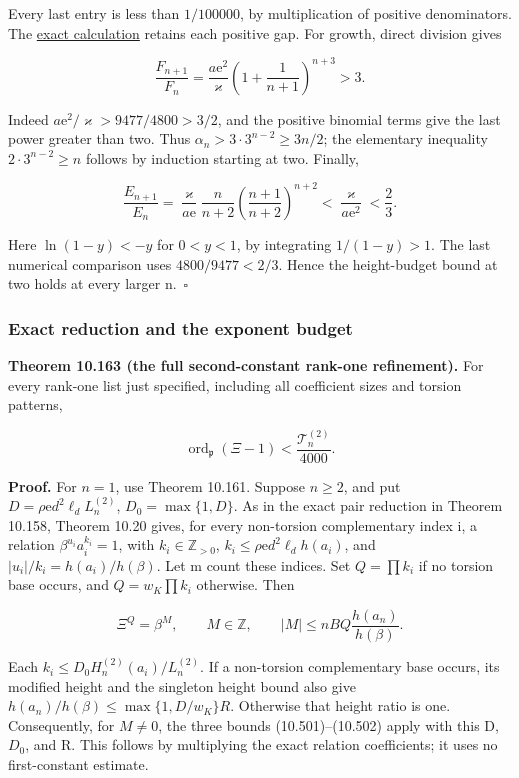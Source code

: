 \documentclass[
  11pt,
  a4paper,
]{article}
\begin{document}
Every last entry is less than \(1/100000\), by multiplication of
positive denominators. The
\href{../figure_sources/yu_second_rank_one_budget.py}{exact calculation}
retains each positive gap. For growth, direct division gives

\[
\frac{F_{n+1}}{F_n}
=\frac{a\mathrm e^2}{\varkappa}
\left(1+\frac1{n+1}\right)^{n+3}>3.
\tag{10.532}
\]

Indeed \(a\mathrm e^2/\varkappa>9477/4800>3/2\), and the positive
binomial terms give the last power greater than two. Thus
\(\alpha_n>3\cdot3^{n-2}\ge3n/2\); the elementary inequality
\(2\cdot3^{n-2}\ge n\) follows by induction starting at two. Finally,

\[
\frac{E_{n+1}}{E_n}
=\frac{\varkappa}{a\mathrm e}\frac n{n+2}
\left(\frac{n+1}{n+2}\right)^{n+2}
<\frac{\varkappa}{a\mathrm e^2}<\frac23.
\tag{10.533}
\]

Here \(\ln(1-y)<-y\) for \(0<y<1\), by integrating \(1/(1-y)>1\). The
last numerical comparison uses \(4800/9477<2/3\). Hence the
height-budget bound at two holds at every larger n.~\(\square\)

\subsubsection{Exact reduction and the exponent
budget}\label{exact-reduction-and-the-exponent-budget}

\textbf{Theorem 10.163 (the full second-constant rank-one refinement).}
For every rank-one list just specified, including all coefficient sizes
and torsion patterns,

\[
\operatorname{ord}_{\mathfrak p}(\Xi-1)
<\frac{\mathcal T_n^{(2)}}{4000}.
\tag{10.534}
\]

\textbf{Proof.} For \(n=1\), use Theorem 10.161. Suppose \(n\ge2\), and
put \(D=\rho\mathrm e d^2\ell_dL_n^{(2)}\), \(D_0=\max\{1,D\}\). As in
the exact pair reduction in Theorem 10.158, Theorem 10.20 gives, for
every non-torsion complementary index i, a relation
\(\beta^{u_i}a_i^{k_i}=1\), with \(k_i\in\mathbb Z_{>0}\),
\(k_i\le\rho\mathrm e d^2\ell_dh(a_i)\), and
\(|u_i|/k_i=h(a_i)/h(\beta)\). Let m count these indices. Set
\(Q=\prod k_i\) if no torsion base occurs, and \(Q=w_K\prod k_i\)
otherwise. Then

\[
\Xi^Q=\beta^M,\qquad M\in\mathbb Z,\qquad
|M|\le nBQ\frac{h(a_n)}{h(\beta)}.
\tag{10.535}
\]

Each \(k_i\le D_0H_n^{(2)}(a_i)/L_n^{(2)}\). If a non-torsion
complementary base occurs, its modified height and the singleton height
bound also give \(h(a_n)/h(\beta)\le\max\{1,D/w_K\}R\). Otherwise that
height ratio is one. Consequently, for \(M\ne0\), the three bounds
(10.501)--(10.502) apply with this D, \(D_0\), and R. This follows by
multiplying the exact relation coefficients; it uses no first-constant
estimate.
\end{document}
